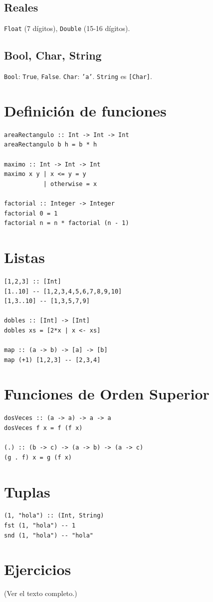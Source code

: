 \subsection{Reales}
\texttt{Float} (7 dígitos), \texttt{Double} (15-16 dígitos).

\subsection{Bool, Char, String}
\texttt{Bool}: \texttt{True}, \texttt{False}. \texttt{Char}: \texttt{'a'}. \texttt{String} es \texttt{[Char]}.

\section{Definición de funciones}

\begin{lstlisting}
areaRectangulo :: Int -> Int -> Int
areaRectangulo b h = b * h

maximo :: Int -> Int -> Int
maximo x y | x <= y = y
           | otherwise = x

factorial :: Integer -> Integer
factorial 0 = 1
factorial n = n * factorial (n - 1)
\end{lstlisting}

\section{Listas}

\begin{lstlisting}
[1,2,3] :: [Int]
[1..10] -- [1,2,3,4,5,6,7,8,9,10]
[1,3..10] -- [1,3,5,7,9]

dobles :: [Int] -> [Int]
dobles xs = [2*x | x <- xs]

map :: (a -> b) -> [a] -> [b]
map (+1) [1,2,3] -- [2,3,4]
\end{lstlisting}

\section{Funciones de Orden Superior}

\begin{lstlisting}
dosVeces :: (a -> a) -> a -> a
dosVeces f x = f (f x)

(.) :: (b -> c) -> (a -> b) -> (a -> c)
(g . f) x = g (f x)
\end{lstlisting}

\section{Tuplas}

\begin{lstlisting}
(1, "hola") :: (Int, String)
fst (1, "hola") -- 1
snd (1, "hola") -- "hola"
\end{lstlisting}

\section{Ejercicios}
(Ver el texto completo.)